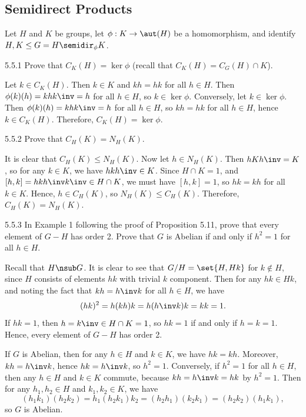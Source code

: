 \subsection{Semidirect Products}

Let $H$ and $K$ be groups, let $\phi : K \to \aut(H)$ be a homomorphism, and identify $H, K \leq G = H \semidir_\phi K$.

\begin{exercise}{5.5.1}
    Prove that $C_K(H) = \ker\phi$ (recall that $C_K(H) = C_G(H) \cap K$).
\end{exercise}

\begin{sol}
    Let $k \in C_K(H)$.
	Then $k \in K$ and $kh = hk$ for all $h \in H$.
	Then $\phi(k)(h) = khk\inv = h$ for all $h \in H$, so $k \in \ker\phi$.
	Conversely, let $k \in \ker\phi$.
	Then $\phi(k)(h) = khk\inv = h$ for all $h \in H$, so $kh = hk$ for all $h \in H$, hence $k \in C_K(H)$.
	Therefore, $C_K(H) = \ker\phi$.
\end{sol}

\begin{exercise}{5.5.2}
    Prove that $C_H(K) = N_H(K)$.
\end{exercise}

\begin{sol}
    It is clear that $C_H(K) \leq N_H(K)$.
	Now let $h \in N_H(K)$.
	Then $hKh\inv = K$, so for any $k \in K$, we have $hkh\inv \in K$.
	Since $H \cap K = 1$, and $[h, k] = hkh\inv k\inv \in H \cap K$, we must have $[h, k] = 1$, so $hk = kh$ for all $k \in K$.
	Hence, $h \in C_H(K)$, so $N_H(K) \leq C_H(K)$.
	Therefore, $C_H(K) = N_H(K)$.
\end{sol}

\begin{exercise}{5.5.3}
    In Example 1 following the proof of Proposition 5.11, prove that every element of $G - H$ has order 2.
	Prove that $G$ is Abelian if and only if $h^2 = 1$ for all $h \in H$.
\end{exercise}

\begin{sol}
    Recall that $H \nsub G$.
	It is clear to see that $G/H = \set{H, Hk}$ for $k \notin H$, since $H$ consists of elements $hk$ with trivial $k$ component.
	Then for any $hk \in Hk$, and noting the fact that $kh = h\inv k$ for all $h \in H$, we have
    \[
    	(hk)^2 = h(kh)k = h(h\inv k)k = kk = 1.
    \]
    If $hk = 1$, then $h = k\inv \in H \cap K = 1$, so $hk = 1$ if and only if $h = k = 1$.
	Hence, every element of $G - H$ has order 2.

    If $G$ is Abelian, then for any $h \in H$ and $k \in K$, we have $hk = kh$.
	Moreover, $kh = h\inv k$, hence $hk = h\inv k$, so $h^2 = 1$.
	Conversely, if $h^2 = 1$ for all $h \in H$, then any $h \in H$ and $k \in K$ commute, because $kh = h\inv k = hk$ by $h^2 = 1$.
	Then for any $h_1, h_2 \in H$ and $k_1, k_2 \in K$, we have
    \[
    	(h_1k_1)(h_2k_2) = h_1(h_2k_1)k_2 = (h_2h_1)(k_2k_1) = (h_2k_2)(h_1k_1),
    \]
    so $G$ is Abelian.
\end{sol}

